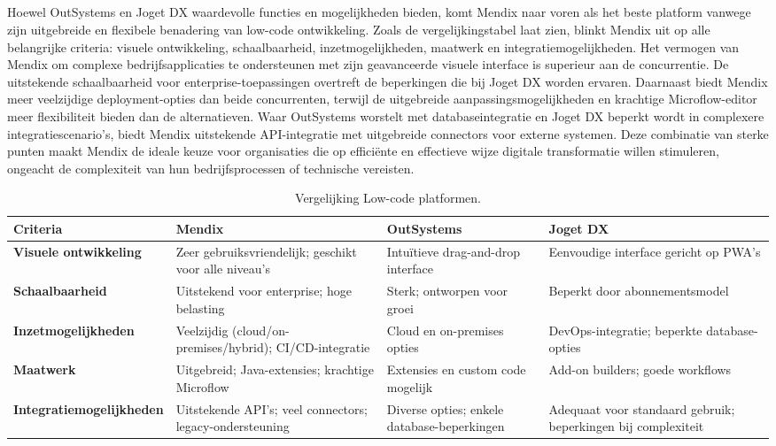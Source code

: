 \subsection{}
Hoewel OutSystems en Joget DX waardevolle functies en mogelijkheden bieden, komt Mendix naar voren als het beste platform vanwege zijn uitgebreide en flexibele benadering van low-code ontwikkeling. Zoals de vergelijkingstabel laat zien, blinkt Mendix uit op alle belangrijke criteria: visuele ontwikkeling, schaalbaarheid, inzetmogelijkheden, maatwerk en integratiemogelijkheden.
Het vermogen van Mendix om complexe bedrijfsapplicaties te ondersteunen met zijn geavanceerde visuele interface is superieur aan de concurrentie. De uitstekende schaalbaarheid voor enterprise-toepassingen overtreft de beperkingen die bij Joget DX worden ervaren. Daarnaast biedt Mendix meer veelzijdige deployment-opties dan beide concurrenten, terwijl de uitgebreide aanpassingsmogelijkheden en krachtige Microflow-editor meer flexibiliteit bieden dan de alternatieven.
Waar OutSystems worstelt met databaseintegratie en Joget DX beperkt wordt in complexere integratiescenario's, biedt Mendix uitstekende API-integratie met uitgebreide connectors voor externe systemen. Deze combinatie van sterke punten maakt Mendix de ideale keuze voor organisaties die op efficiënte en effectieve wijze digitale transformatie willen stimuleren, ongeacht de complexiteit van hun bedrijfsprocessen of technische vereisten.

\begin{table}
    \centering
    \begin{tabular}{ |p{5cm}|p{3cm}|p{3cm}|p{3cm}|   }
        \hline
        Criteria & \textbf{Mendix} & \textbf{OutSystems} & \textbf{Joget DX} \\
        \hline
        \textbf{Visuele ontwikkeling} & Zeer gebruiksvriendelijk; geschikt voor alle niveau's & Intuïtieve drag-and-drop interface & Eenvoudige interface gericht op PWA's\\
        \textbf{Schaalbaarheid} & Uitstekend voor enterprise; hoge belasting   & Sterk; ontworpen voor groei & Beperkt door abonnementsmodel \\
        \textbf{Inzetmogelijkheden} & Veelzijdig (cloud/on-premises/hybrid); CI/CD-integratie & Cloud en on-premises opties & DevOps-integratie; beperkte database-opties \\
        \textbf{Maatwerk}    & Uitgebreid; Java-extensies; krachtige Microflow & Extensies en custom code mogelijk & Add-on builders; goede workflows \\
        \textbf{Integratiemogelijkheden} & Uitstekende API's; veel connectors; legacy-ondersteuning & Diverse opties; enkele database-beperkingen & Adequaat voor standaard gebruik; beperkingen bij complexiteit \\
        \hline
    \end{tabular}
    \caption[Voorbeeld tabel]{\label{tab:Vergelijking Low-code platformen}Vergelijking Low-code platformen.}
\end{table}

